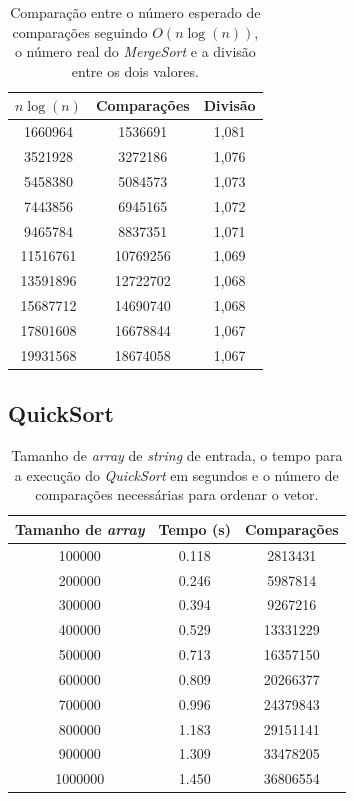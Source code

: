 \documentclass[12pt,a4paper,oneside]{article}
\begin{document}
\begin{table}[H]
\caption{Comparação entre o número esperado de comparações seguindo $O(n\log{(n)})$, o número real do \textit{MergeSort} e a divisão entre os dois valores.}
\label{tab:mOK}
\begin{center}
\begin{tabular}{|c c c|}
\hline
$n\log{(n)}$ & Comparações  & Divisão\\
\hline
1660964 & 1536691 & 1,081\\
3521928 & 3272186 & 1,076\\
5458380 & 5084573 & 1,073\\
7443856 & 6945165 & 1,072\\
9465784 & 8837351 & 1,071\\
11516761 & 10769256 & 1,069\\
13591896 & 12722702 & 1,068\\
15687712 & 14690740 & 1,068\\
17801608 & 16678844 & 1,067\\
19931568 & 18674058 & 1,067\\
\hline
\end{tabular}
\end{center}
\end{table}

\subsection{QuickSort}

\begin{table}[H]
\caption{Tamanho de \textit{array} de \textit{string} de entrada, o tempo para a execução do \textit{QuickSort} em segundos e o número de comparações necessárias para ordenar o vetor.}
\label{tab:dq}
\begin{center}
\begin{tabular}{|c c c|}
\hline
Tamanho de \textit{array}	& Tempo (s)	& Comparações 	\\
\hline
100000 & 0.118 & 2813431\\
200000 & 0.246 & 5987814\\
300000 & 0.394 & 9267216\\
400000 & 0.529 & 13331229\\
500000 & 0.713 & 16357150\\
600000 & 0.809 & 20266377\\
700000 & 0.996 & 24379843\\
800000 & 1.183 & 29151141\\
900000 & 1.309 & 33478205\\
1000000 & 1.450 & 36806554\\
\hline
\end{tabular}
\end{center}
\end{table}
\end{document}
